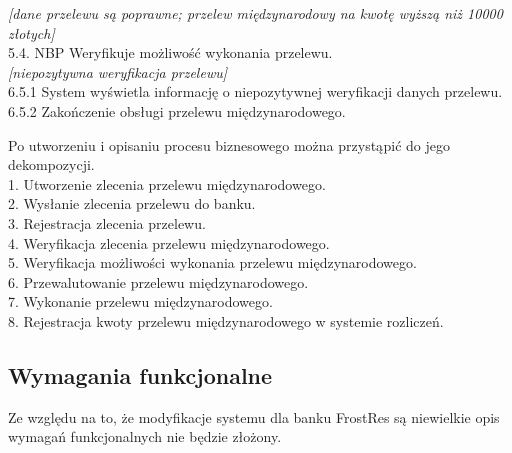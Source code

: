 \begin{flushleft}
\textit{{[}dane przelewu są poprawne; przelew międzynarodowy na kwotę wyższą niż 10000 złotych{]}}\\
\hspace{1ex}5.4. NBP Weryfikuje możliwość wykonania przelewu.\\
\hspace{1ex}\textit{{[}niepozytywna weryfikacja przelewu{]}}\\
\hspace{2ex}6.5.1 System wyświetla informację o niepozytywnej weryfikacji danych przelewu.\\
\hspace{2ex}6.5.2 Zakończenie obsługi przelewu międzynarodowego.\\ 
\end{flushleft}

\begin{flushleft}
Po utworzeniu i opisaniu procesu biznesowego można przystąpić do jego dekompozycji. \\
\hspace{1ex}1. Utworzenie zlecenia przelewu międzynarodowego.\\
\hspace{1ex}2. Wysłanie zlecenia przelewu do banku.\\
\hspace{1ex}3. Rejestracja zlecenia przelewu.\\
\hspace{1ex}4. Weryfikacja zlecenia przelewu międzynarodowego.\\
\hspace{1ex}5. Weryfikacja możliwości wykonania przelewu międzynarodowego.\\
\hspace{1ex}6. Przewalutowanie przelewu międzynarodowego.\\
\hspace{1ex}7. Wykonanie przelewu międzynarodowego.\\
\hspace{1ex}8. Rejestracja kwoty przelewu międzynarodowego w systemie rozliczeń.\\
\end{flushleft}

\subsection*{Wymagania funkcjonalne}
Ze względu na to, że modyfikacje systemu dla banku FrostRes są niewielkie opis wymagań funkcjonalnych nie będzie złożony. 

